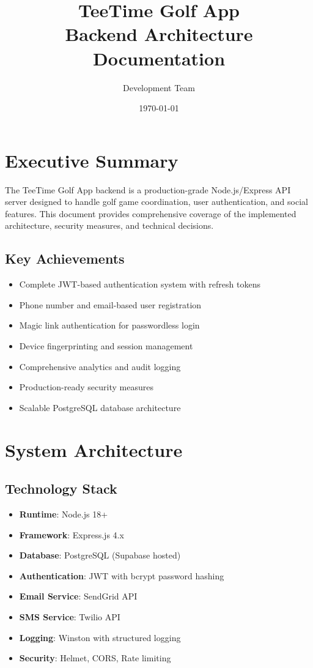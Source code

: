 \documentclass[12pt,a4paper]{article}
\title{\textbf{TeeTime Golf App}\\Backend Architecture Documentation}
\author{Development Team}
\date{\today}
\begin{document}
\maketitle
\tableofcontents
\newpage

\section{Executive Summary}

The TeeTime Golf App backend is a production-grade Node.js/Express API server designed to handle golf game coordination, user authentication, and social features. This document provides comprehensive coverage of the implemented architecture, security measures, and technical decisions.

\subsection{Key Achievements}
\begin{itemize}
    \item Complete JWT-based authentication system with refresh tokens
    \item Phone number and email-based user registration
    \item Magic link authentication for passwordless login
    \item Device fingerprinting and session management
    \item Comprehensive analytics and audit logging
    \item Production-ready security measures
    \item Scalable PostgreSQL database architecture
\end{itemize}

\section{System Architecture}

\subsection{Technology Stack}
\begin{itemize}
    \item \textbf{Runtime}: Node.js 18+
    \item \textbf{Framework}: Express.js 4.x
    \item \textbf{Database}: PostgreSQL (Supabase hosted)
    \item \textbf{Authentication}: JWT with bcrypt password hashing
    \item \textbf{Email Service}: SendGrid API
    \item \textbf{SMS Service}: Twilio API
    \item \textbf{Logging}: Winston with structured logging
    \item \textbf{Security}: Helmet, CORS, Rate limiting
\end{itemize}
\end{document}
